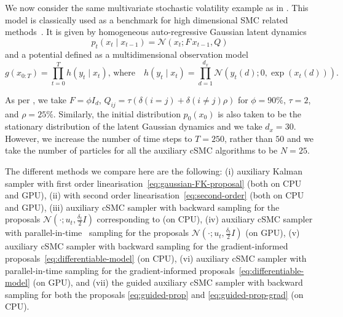 We now consider the same multivariate stochastic volatility example as in \citet[Section E.3.]{finke2021csmc}. This model is classically used as a benchmark for high dimensional SMC related methods~\citep[see also][]{guarniero2017iterated}. It is given by homogeneous auto-regressive Gaussian latent dynamics
\begin{equation}
    p_t(x_t \mid x_{t-1}) = \mathcal{N}(x_t; F\, x_{t-1}, Q)
\end{equation}
and a potential defined as a multidimensional observation model
\begin{equation}
    g(x_{0:T}) = \prod_{t=0}^T h(y_t \mid x_t),\, \text{where}\quad h(y_t \mid x_t) = \prod_{d=1}^{d_x}\mathcal{N}(y_t(d); 0, \exp(x_t(d))).
\end{equation}

As per \citet{finke2021csmc}, we take $F = \phi I_d$, $Q_{ij} = \tau (\delta(i=j) + \delta(i \neq j) \rho)$ for $\phi = 90\%$, $\tau = 2$, and $\rho = 25\%$. Similarly, the initial distribution $p_0(x_0)$ is also taken to be the stationary distribution of the latent Gaussian dynamics and we take $d_x = 30$. However, we increase the number of time steps to $T=250$, rather than $50$ and we take the number of particles for all the auxiliary cSMC algorithms to be $N=25$. %

The different methods we compare here are the following: (i) auxiliary Kalman sampler with first order linearisation~\eqref{eq:gaussian-FK-proposal} (both on CPU and GPU), (ii) with second order linearisation~\eqref{eq:second-order} (both on CPU and GPU), (iii) auxiliary cSMC sampler with backward sampling for the proposals $\mathcal{N}(\cdot; u_t, \frac{\delta_t}{2}I)$ corresponding to \citet{finke2021csmc} (on CPU), (iv) auxiliary cSMC sampler with parallel-in-time~\citep{corenflos2022sequentialized} sampling for the proposals $\mathcal{N}(\cdot; u_t, \frac{\delta_t}{2}I)$ (on GPU), (v) auxiliary cSMC sampler with backward sampling for the gradient-informed proposals~\eqref{eq:differentiable-model} (on CPU), (vi) auxiliary cSMC sampler with parallel-in-time sampling for the gradient-informed proposals~\eqref{eq:differentiable-model} (on GPU), and (vii) the guided auxiliary cSMC sampler with backward sampling for both the proposals \eqref{eq:guided-prop} and \eqref{eq:guided-prop-grad} (on CPU).


